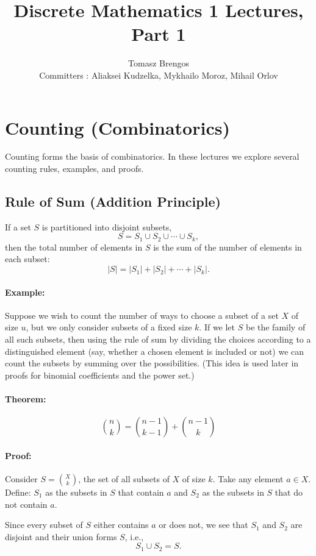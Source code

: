 \documentclass{article}
\title{Discrete Mathematics 1 Lectures, Part 1}
\author{Tomasz Brengos \\  
Committers : Aliaksei Kudzelka, Mykhailo Moroz, Mihail Orlov}
\date{}
\begin{document}
\maketitle

\section{Counting (Combinatorics)}

Counting forms the basis of combinatorics. In these lectures we explore several counting rules, examples, and proofs.

\subsection{Rule of Sum (Addition Principle)}
If a set $S$ is partitioned into disjoint subsets,
\[
S = S_1 \cup S_2 \cup \cdots \cup S_k,
\]
then the total number of elements in $S$ is the sum of the number of elements in each subset:
\[
|S| = |S_1| + |S_2| + \cdots + |S_k|.
\]

\paragraph{Example:}  
Suppose we wish to count the number of ways to choose a subset of a set $X$ of size $u$, but we only consider subsets of a fixed size $k$. If we let $S$ be the family of all such subsets, then using the rule of sum by dividing the choices according to a distinguished element (say, whether a chosen element is included or not) we can count the subsets by summing over the possibilities. (This idea is used later in proofs for binomial coefficients and the power set.)

\paragraph{Theorem:}
\[
\binom{n}{k} = \binom{n-1}{k-1} + \binom{n-1}{k}
\]

\paragraph{Proof:}
Consider \( S = \binom{X}{k} \), the set of all subsets of \( X \) of size \( k \).  
Take any element \( a \in X \). Define:  
 \( S_1 \) as the subsets in \( S \) that contain \( a \) and  
 \( S_2 \) as the subsets in \( S \) that do not contain \( a \).  

Since every subset of \( S \) either contains \( a \) or does not, we see that \( S_1 \) and \( S_2 \) are disjoint and their union forms \( S \), i.e.,  
\[
S_1 \cup S_2 = S.
\]
\end{document}
